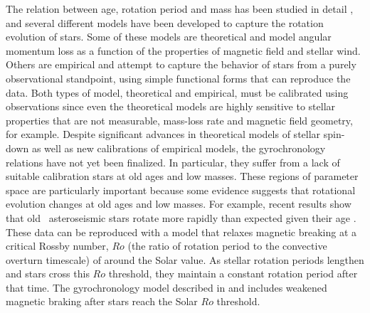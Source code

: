 The relation between age, rotation period and mass has been studied in detail
, and several different models have been developed to
capture the rotation evolution of stars.
Some of these models are theoretical and model angular momentum loss as a
function of the properties of magnetic field and stellar wind.
Others are empirical and attempt to capture the behavior of stars from a
purely observational standpoint, using simple functional forms that can
reproduce the data.
Both types of model, theoretical and empirical, must be calibrated using
observations since even the theoretical models are highly sensitive to stellar
properties that are not measurable, mass-loss rate and magnetic field
geometry, for example.
Despite significant advances in theoretical models of stellar spin-down as
well as new calibrations of empirical models, the gyrochronology relations
have not yet been finalized.
In particular, they suffer from a lack of suitable calibration stars at old
ages and low masses.
These regions of parameter space are particularly important because some
evidence suggests that rotational evolution changes at old ages and low
masses.
For example, recent results show that old \kepler\ asteroseismic stars rotate
more rapidly than expected given their age \citep[\eg][]{Angus2015,
vansaders2016}.
These data can be reproduced with a model that relaxes magnetic breaking at a
critical Rossby number, $Ro$ (the ratio of rotation period to the convective
overturn timescale) of around the Solar value.
As stellar rotation periods lengthen and stars cross this $Ro$ threshold, they
maintain a constant rotation period after that time.
The gyrochronology model described in \citet{vansaders2016} and
\citet{vansaders2018} includes weakened magnetic braking after stars reach the
Solar $Ro$ threshold.

